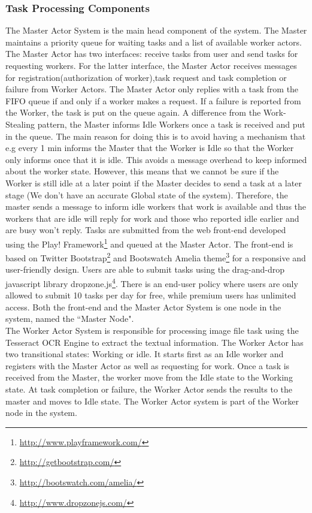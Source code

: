 \documentclass[conference]{IEEEtran}
\begin{document}
\subsubsection{Task Processing Components}\label{sec:sysdesign_task}
The Master Actor System is the main head component of the system. The Master maintains a priority queue for waiting tasks and a list of available worker actors. The Master Actor has two interfaces: receive tasks from user and send tasks for requesting workers. For the latter interface, the Master Actor receives messages for registration(authorization of worker),task request and task completion or failure from Worker Actors. The Master Actor only replies with a task from the FIFO queue if and only if a worker makes a request. If a failure is reported from the Worker, the task is put on the queue again. A difference from the Work-Stealing pattern, the Master informs Idle Workers once a task is received and put in the queue. The main reason for doing this is to avoid having a mechanism that e.g every 1 min informs the Master that the Worker is Idle so that the Worker only informs once that it is idle. This avoids a message overhead to keep informed about the worker state. However, this means that we cannot be sure if the Worker is still idle at a later point if the Master decides to send a task at a later stage (We don't have an accurate Global state of the system). Therefore, the master sends a message to inform idle workers that work is available and thus the workers that are idle will reply for work and those who reported idle earlier and are busy won't reply. 
Tasks are submitted from the web front-end developed using the Play! Framework\footnote{\url{http://www.playframework.com/}} and queued at the Master Actor.  The front-end is based on Twitter Bootstrap\footnote{\url{http://getbootstrap.com/}} and Bootswatch Amelia theme\footnote{\url{http://bootswatch.com/amelia/}} for a responsive and user-friendly design. Users are able to submit tasks using the drag-and-drop javascript library dropzone.js\footnote{\url{http://www.dropzonejs.com/}}. There is an end-user policy where users are only allowed to submit 10 tasks per day for free, while premium users has unlimited access. Both the front-end and the Master Actor System is one node in the system, named the ``Master Node". \\
The Worker Actor System is responsible for processing image file task using the Tesseract OCR Engine to extract the textual information. The Worker Actor has two transitional states: Working or idle. It starts first as an Idle worker and registers with the Master Actor as well as requesting for work. Once a task is received from the Master, the worker move from the Idle state to the Working state. At task completion or failure, the Worker Actor sends the results to the master and moves to Idle state. The Worker Actor system is part of the Worker node in the system. \\
\end{document}
